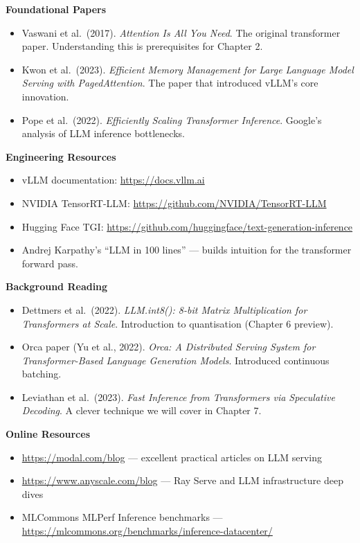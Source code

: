\documentclass[12pt, twoside, openright]{book}
\newenvironment{furtherreading}{%
  \begin{tcolorbox}[
    enhanced, breakable,
    colback=gray!5, colframe=gray!50,
    title={\bfseries Further Reading \& References},
    coltitle=black, colbacktitle=gray!20,
    arc=3pt, left=6pt, right=6pt,
  ]
}{%
  \end{tcolorbox}
}
\begin{document}
\begin{furtherreading}
\textbf{Foundational Papers}
\begin{itemize}
  \item Vaswani et al.\ (2017). \textit{Attention Is All You Need}.
        The original transformer paper. Understanding this is
        prerequisites for Chapter 2.
  \item Kwon et al.\ (2023). \textit{Efficient Memory Management for
        Large Language Model Serving with PagedAttention}.
        The paper that introduced vLLM's core innovation.
  \item Pope et al.\ (2022). \textit{Efficiently Scaling Transformer
        Inference}. Google's analysis of LLM inference bottlenecks.
\end{itemize}

\textbf{Engineering Resources}
\begin{itemize}
  \item vLLM documentation: \url{https://docs.vllm.ai}
  \item NVIDIA TensorRT-LLM: \url{https://github.com/NVIDIA/TensorRT-LLM}
  \item Hugging Face TGI: \url{https://github.com/huggingface/text-generation-inference}
  \item Andrej Karpathy's ``LLM in 100 lines'' --- builds intuition
        for the transformer forward pass.
\end{itemize}

\textbf{Background Reading}
\begin{itemize}
  \item Dettmers et al.\ (2022). \textit{LLM.int8(): 8-bit Matrix
        Multiplication for Transformers at Scale}.
        Introduction to quantisation (Chapter 6 preview).
  \item Orca paper (Yu et al., 2022). \textit{Orca: A Distributed
        Serving System for Transformer-Based Language Generation Models}.
        Introduced continuous batching.
  \item Leviathan et al.\ (2023). \textit{Fast Inference from
        Transformers via Speculative Decoding}.
        A clever technique we will cover in Chapter 7.
\end{itemize}

\textbf{Online Resources}
\begin{itemize}
  \item \url{https://modal.com/blog} --- excellent practical articles
        on LLM serving
  \item \url{https://www.anyscale.com/blog} --- Ray Serve and LLM
        infrastructure deep dives
  \item MLCommons MLPerf Inference benchmarks ---
        \url{https://mlcommons.org/benchmarks/inference-datacenter/}
\end{itemize}
\end{furtherreading}
\end{document}
